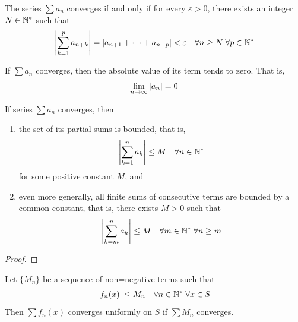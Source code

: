 \documentclass[thmcnt=section, 12pt]{my-elegantbook}
\begin{document}
\begin{theorem} \label{thm:53}
    The series $\sum a_n$ converges if and only if for every $\varepsilon > 0$, there exists an integer $N \in \mathbb{N}^\ast$ such that 
    \begin{align*}
        \left\lvert \sum_{k=1}^p a_{n+k} \right\rvert 
        = \left\lvert a_{n+1} + \cdots + a_{n+p} \right\rvert
        < \varepsilon
        \quad
        \forall n \geq N \; 
        \forall p \in \mathbb{N}^\ast
    \end{align*}
\end{theorem}

\begin{corollary} \label{cor:2}
    If $\sum a_n$ converges, then the absolute value of its term tends to zero. That is, 
    \begin{align*}
        \lim_{n \to \infty} \left\lvert a_n \right\rvert = 0
    \end{align*}
\end{corollary}


\begin{theorem} \label{thm:51}
    If series $\sum a_n$ converges, then 
    \begin{enumerate}
        \item the set of its partial sums is bounded, that is, 
        \begin{align*}
            \left\lvert \sum_{k=1}^n a_k \right\rvert \leq M
            \quad \forall n \in \mathbb{N}^\ast
        \end{align*}
        for some positive constant $M$, and
        \item even more generally, all finite sums of consecutive terms are bounded by a common constant, that is, there exists $M > 0$ such that 
        \begin{align*}
            \left\lvert \sum_{k=m}^n a_k \right\rvert \leq M
            \quad \forall m \in \mathbb{N}^\ast \; 
            \forall n \geq m
        \end{align*}
    \end{enumerate}
\end{theorem}

\begin{proof}
\end{proof}


\begin{theorem} \label{thm:56}
    Let $\{M_n\}$ be a sequence of non=negative terms such that 
    \begin{align*}
        \left\lvert f_n(x) \right\rvert \leq M_n
        \quad \forall n \in \mathbb{N}^\ast \; 
        \forall x \in S
    \end{align*}
    Then $\sum f_n(x)$ converges uniformly on $S$ if $\sum M_n$ converges.
\end{theorem}
\end{document}
